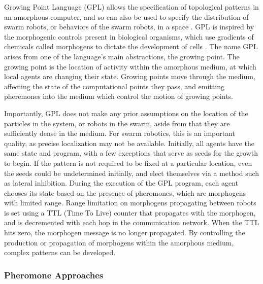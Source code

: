 \documentclass[]{article}
\begin{document}
Growing Point Language (GPL) allows the specification of topological patterns in an amorphous computer, and so can also be used to specify the distribution of swarm robots, or behaviors of the swarm robots, in a space \cite{nagpal2004engineering}. 
GPL is inspired by the morphogenic controls present in biological organisms, which use gradients of chemicals called morphogens to dictate the development of cells \cite{turing1952chemical}.
The name GPL arises from one of the language's main abstractions, the growing point. 
The growing point is the location of activity within the amorphous medium, at which local agents are changing their state. 
Growing points move through the medium, affecting the state of the computational points they pass, and emitting pheremones into the medium which control the motion of growing points.

Importantly, GPL does not make any prior assumptions on the location of the particles in the system, or robots in the swarm, aside from that they are sufficiently dense in the medium. 
For swarm robotics, this is an important quality, as precise localization may not be available. 
Initially, all agents have the same state and program, with a few exceptions that serve as seeds for the growth to begin. 
If the pattern is not required to be fixed at a particular location, even the seeds could be undetermined initially, and elect themselves via a method such as lateral inhibition. 
During the execution of the GPL program, each agent chooses its state based on the presence of pheromones, which are morphogens with limited range. 
Range limitation on morphogens propagating between robots is set using a TTL (Time To Live) counter that propagates with the morphogen, and is decremented with each hop in the communication network. 
When the TTL hits zero, the morphogen message is no longer propagated. 
By controlling the production or propagation of morphogens within the amorphous medium, complex patterns can be developed. 

\subsubsection{Pheromone Approaches}
\end{document}
